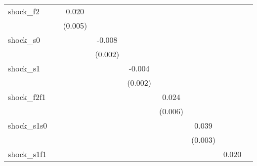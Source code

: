 {\begin{tabular}{l*{8}{c}}
\addlinespace
shock\_f2    &                     &       0.020\sym{***}&                     &                     &                     &                     &                     &                     \\
            &                     &     (0.005)         &                     &                     &                     &                     &                     &                     \\
\addlinespace
shock\_s0    &                     &                     &      -0.008\sym{***}&                     &                     &                     &                     &                     \\
            &                     &                     &     (0.002)         &                     &                     &                     &                     &                     \\
\addlinespace
shock\_s1    &                     &                     &                     &      -0.004\sym{**} &                     &                     &                     &                     \\
            &                     &                     &                     &     (0.002)         &                     &                     &                     &                     \\
\addlinespace
shock\_f2f1  &                     &                     &                     &                     &       0.024\sym{***}&                     &                     &                     \\
            &                     &                     &                     &                     &     (0.006)         &                     &                     &                     \\
\addlinespace
shock\_s1s0  &                     &                     &                     &                     &                     &       0.039\sym{***}&                     &                     \\
            &                     &                     &                     &                     &                     &     (0.003)         &                     &                     \\
\addlinespace
shock\_s1f1  &                     &                     &                     &                     &                     &                     &       0.020\sym{***}&                     \\

\end{tabular}}
